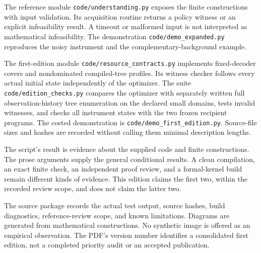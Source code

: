 \documentclass[11pt,letterpaper]{article}
\theoremstyle{plain}
\theoremstyle{definition}
\newcommand{\code}[1]{\texttt{\small #1}}
\begin{document}
The reference module \code{code/understanding.py} exposes the finite constructions with input validation. Its acquisition routine returns a policy witness or an explicit infeasibility result. A timeout or malformed input is not interpreted as mathematical infeasibility. The demonstration \code{code/demo\_expanded.py} reproduces the noisy instrument and the complementary-background example.

The first-edition module \code{code/resource\_contracts.py} implements fixed-decoder covers and nondominated compiled-tree profiles. Its witness checker follows every actual initial state independently of the optimizer. The suite \code{code/edition\_checks.py} compares the optimizer with separately written full observation-history tree enumeration on the declared small domains, tests invalid witnesses, and checks all instrument states with the two frozen recipient programs. The costed demonstration is \code{code/demo\_first\_edition.py}. Source-file sizes and hashes are recorded without calling them minimal description lengths.

The script's result is evidence about the supplied code and finite constructions. The prose arguments supply the general conditional results. A clean compilation, an exact finite check, an independent proof review, and a formal-kernel build remain different kinds of evidence. This edition claims the first two, within the recorded review scope, and does not claim the latter two.

The source package records the actual test output, source hashes, build diagnostics, reference-review scope, and known limitations. Diagrams are generated from mathematical constructions. No synthetic image is offered as an empirical observation. The PDF's version number identifies a consolidated first edition, not a completed priority audit or an accepted publication.
\end{document}
